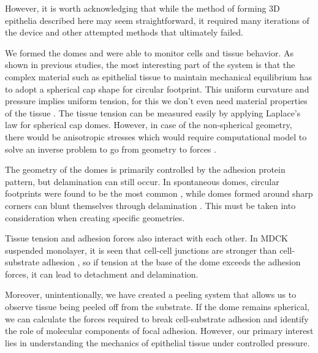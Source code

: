 However, it is worth acknowledging that while the method of forming 3D epithelia described here may seem straightforward, it required many iterations of the device and other attempted methods that ultimately failed.  

We formed the domes and were able to monitor cells and tissue behavior. As shown in previous studies, the most interesting part of the system is that the complex material such as epithelial tissue to maintain mechanical equilibrium has to adopt a spherical cap shape for circular footprint. This uniform curvature and pressure implies uniform tension, for this we don't even need material properties of the tissue \cite{latorre2018,marin-llaurado2022}. The tissue tension can be measured easily by applying Laplace's law for spherical cap domes. However, in case of the non-spherical geometry, there would be anisotropic stresses which would require computational model to solve an inverse problem to go from geometry to forces \cite{marin-llaurado2022}.  

The geometry of the domes is primarily controlled by the adhesion protein pattern, but delamination can still occur. In spontaneous domes, circular footprints were found to be the most common \cite{tanner1983}, while domes formed around sharp corners can blunt themselves through delamination \cite{latorre2018}. This must be taken into consideration when creating specific geometries.  

Tissue tension and adhesion forces also interact with each other. In MDCK suspended monolayer, it is seen that cell-cell junctions are stronger than cell-substrate adhesion \cite{harris2012}, so if tension at the base of the dome exceeds the adhesion forces, it can lead to detachment and delamination.  

Moreover, unintentionally, we have created a peeling system that allows us to observe tissue being peeled off from the substrate. If the dome remains spherical, we can calculate the forces required to break cell-substrate adhesion and identify the role of molecular components of focal adhesion. However, our primary interest lies in understanding the mechanics of epithelial tissue under controlled pressure.
